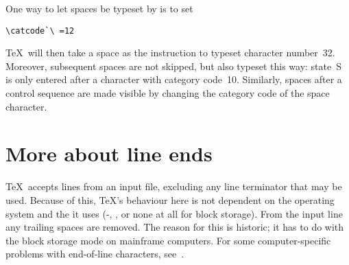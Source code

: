 \documentclass{book}
\begin{document}
One way to
let spaces be typeset by 
is to set
\begin{verbatim}
\catcode`\ =12
\end{verbatim}
\TeX\ will then take a space as the instruction to
typeset character number~32. Moreover, subsequent spaces
are not skipped, but also typeset this way: state~{\italic S}
is only entered after a character with category code~10.
Similarly, spaces after a control sequence are made
visible by changing the category code of the space character.

\section{More about line ends}

\TeX\ accepts lines from an input file, excluding any line
terminator that may be used.
Because of this, \TeX's behaviour here is not dependent
on the operating system and the 
it uses (-,
, or none at all for block storage).
From the input line any trailing spaces are removed.
The reason for this is historic; it has to do with 
the block storage mode on  mainframe computers.
For some computer-specific problems with end-of-line
characters, see~\cite{B:ctrl-M}.
\end{document}
